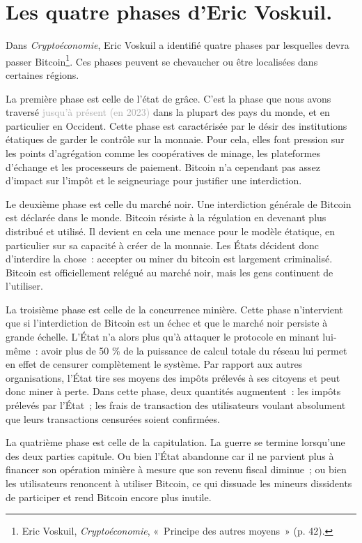 \section{Les quatre phases d'Eric Voskuil.}

Dans \emph{Cryptoéconomie}, Eric Voskuil a identifié quatre phases par lesquelles devra passer Bitcoin\footnote{Eric Voskuil, \emph{Cryptoéconomie}, «~Principe des autres moyens~» (p. 42).}. Ces phases peuvent se chevaucher ou être localisées dans certaines régions.

La première phase est celle de l'état de grâce. C'est la phase que nous avons traversé \textcolor{darkgray}{jusqu'à présent (en 2023)} dans la plupart des pays du monde, et en particulier en Occident. Cette phase est caractérisée par le désir des institutions étatiques de garder le contrôle sur la monnaie. Pour cela, elles font pression sur les points d'agrégation comme les coopératives de minage, les plateformes d'échange et les processeurs de paiement. Bitcoin n'a cependant pas assez d'impact sur l'impôt et le seigneuriage pour justifier une interdiction.

Le deuxième phase est celle du marché noir. Une interdiction générale de Bitcoin est déclarée dans le monde. Bitcoin résiste à la régulation en devenant plus distribué et utilisé. Il devient en cela une menace pour le modèle étatique, en particulier sur sa capacité à créer de la monnaie. Les États décident donc d'interdire la chose~: accepter ou miner du bitcoin est largement criminalisé. Bitcoin est officiellement relégué au marché noir, mais les gens continuent de l'utiliser.

La troisième phase est celle de la concurrence minière. Cette phase n'intervient que si l'interdiction de Bitcoin est un échec et que le marché noir persiste à grande échelle. L'État n'a alors plus qu'à attaquer le protocole en minant lui-même~: avoir plus de 50 \% de la puissance de calcul totale du réseau lui permet en effet de censurer complètement le système. Par rapport aux autres organisations, l'État tire ses moyens des impôts prélevés à ses citoyens et peut donc miner à perte. Dans cette phase, deux quantités augmentent~: les impôts prélevés par l'État~; les frais de transaction des utilisateurs voulant absolument que leurs transactions censurées soient confirmées.

La quatrième phase est celle de la capitulation. La guerre se termine lorsqu'une des deux parties capitule. Ou bien l'État abandonne car il ne parvient plus à financer son opération minière à mesure que son revenu fiscal diminue~; ou bien les utilisateurs renoncent à utiliser Bitcoin, ce qui dissuade les mineurs dissidents de participer et rend Bitcoin encore plus inutile.